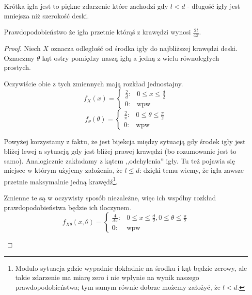 \begin{definition}
    Krótka igła jest to piękne zdarzenie które zachodzi gdy \(l < d\) - długość igły jest mniejsza niż szerokość deski.
\end{definition}

\begin{theorem}
    Prawdopodobieństwo że igła przetnie którąś z krawędzi wynosi \(\frac{2l}{4\pi}\).
\end{theorem}
\begin{proof}
    Niech \(X\) oznacza odległość od środka igły do najbliższej krawędzi deski. Oznaczmy \(\theta\) kąt ostry pomiędzy naszą igłą a jedną z wielu równoległych prostych.
    
    Oczywiście obie z tych zmiennych mają rozkład jednostajny.
    \[
        f_X(x) = 
        \begin{cases}
            \frac{2}{d}: & 0 \leq x \leq \frac{d}{2} \\
            0: & \text{wpw}
        \end{cases}
    \]
    \[
        f_\theta(\theta) = 
        \begin{cases}
            \frac{2}{\pi}: & 0 \leq \theta \leq \frac{\pi}{2} \\
            0: & \text{wpw}
        \end{cases}
    \]
    
    Powyżej korzystamy z faktu, że jest bijekcja między sytuacją gdy środek igły jest bliżej lewej a sytuacją gdy jest bliżej prawej krawędzi (bo rozumowanie jest to samo). Analogicznie zakładamy z kątem ,,odchylenia'' igły. Tu też pojawia się miejsce w którym użyjemy założenia, że \( l \leq d\): dzięki temu wiemy, że igła zawsze przetnie maksymalnie jedną krawędź\footnote{Modulo sytuacja gdzie wypadnie dokładnie na środku i kąt będzie zerowy, ale takie zdarzenie ma miarę zero i nie wpłynie na wynik naszego prawdopodobieństwa; tym samym równie dobrze możemy założyć, że \(l < d\).}.
    
    Zmienne te są w oczywisty sposób niezależne, więc ich wspólny rozkład prawdopodobieństwa będzie ich iloczynem.
    \[
        f_{X\theta}(x, \theta) = 
        \begin{cases}
            \frac{4}{d\pi}: & 0 \leq x \leq \frac{d}{2}, 0 \leq \theta \leq \frac{\pi}{2}  \\
            0: & \text{wpw}
        \end{cases}
    \]
   
    
    \begin{center}


\end{center}
\end{proof}
